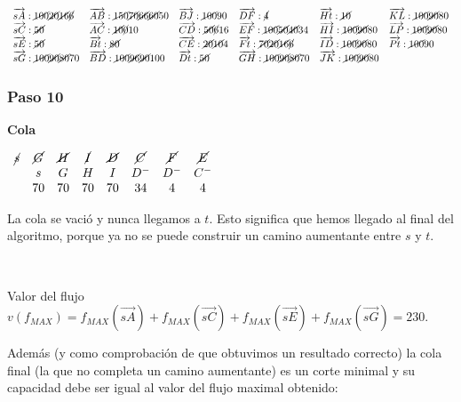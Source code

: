 \documentclass[10pt,a4paper]{article}
\begin{document}
$\begin{array}{llllll} \overrightarrow{sA}: \cancel{100}\cancel{20}\cancel{16}\cancel{6}& \overrightarrow{AB}: \cancel{150} \cancel{70}\cancel{66}\cancel{60}50&\overrightarrow{BJ}: \cancel{100}90& \overrightarrow{DF}: \cancel{4}&\overrightarrow{Ht}: \cancel{10}&\overrightarrow{KL}: \cancel{100}\cancel{90}80\\ \overrightarrow{sC}: \cancel{50}& \overrightarrow{AC}: \cancel{10}\cancel{0}10&\overrightarrow{CD}: \cancel{50}\cancel{6}16&\overrightarrow{EF}: \cancel{100}\cancel{50}\cancel{40}34&\overrightarrow{HI}: \cancel{100}\cancel{90}80&\overrightarrow{LP}: \cancel{100}\cancel{90}80\\ \overrightarrow{sE}: \cancel{50}& \overrightarrow{Bt}: \cancel{80}&\overrightarrow{CE}: \cancel{20}\cancel{10}4 &\overrightarrow{Ft}: \cancel{70}\cancel{20}\cancel{16}\cancel{6}&\overrightarrow{ID}: \cancel{100}\cancel{90}80&\overrightarrow{Pt}: \cancel{100}90\\ \overrightarrow{sG}: \cancel{100}\cancel{90}\cancel{80}70& \overrightarrow{BD}: \cancel{100}\cancel{96}\cancel{90}100&\overrightarrow{Dt}: \cancel{50}&\overrightarrow{GH}: \cancel{100}\cancel{90}\cancel{80}70&\overrightarrow{JK}: \cancel{100}\cancel{90}80&\\ \end{array}$

\subsubsection*{Paso 10}

\textbf{Cola}

\textbf{$\begin{array}{cccccccc} \cancel{s} & \cancel{G} & \cancel{H} & \cancel{I} & \cancel{D} & \cancel{C} & \cancel{F} & \cancel{E}\\ & s & G & H & I & D^- & D^- & C^- \\ & 70 & 70 & 70 & 70 & 34 & 4 & 4 \end{array}$}

La cola se vació y nunca llegamos a $t$. Esto significa que hemos llegado al final del algoritmo, porque ya no se puede construir un camino aumentante entre $s$ y $t$.

 

Valor del flujo $v(f_{MAX}) = f_{MAX} (\overrightarrow{sA}) + f_{MAX} (\overrightarrow{sC}) + f_{MAX} (\overrightarrow{sE}) + f_{MAX} (\overrightarrow{sG}) = 230$.

Además (y como comprobación de que obtuvimos un resultado correcto) la cola final (la que no completa un camino aumentante) es un corte minimal y su capacidad debe ser igual al valor del flujo maximal obtenido:
\end{document}
